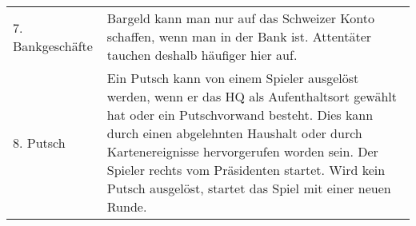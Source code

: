 \documentclass[5pt]{article}
\begin{document}
\begin{tabular}{p{4cm}p{14.5cm}}
		7. Bankgeschäfte 		& 	 Bargeld kann man nur auf das Schweizer Konto schaffen, wenn man in der Bank ist. Attentäter tauchen deshalb häufiger hier auf.\\

		8. Putsch 				& 	 Ein Putsch kann von einem Spieler ausgelöst werden, wenn er  das HQ als Aufenthaltsort gewählt hat oder ein Putschvorwand besteht. Dies kann durch einen abgelehnten Haushalt oder durch Kartenereignisse hervorgerufen worden sein.
								Der Spieler rechts vom Präsidenten startet. Wird kein Putsch ausgelöst, startet das Spiel mit einer neuen Runde.\\    
    
    
    \bottomrule
    \end{tabular}
\end{document}
